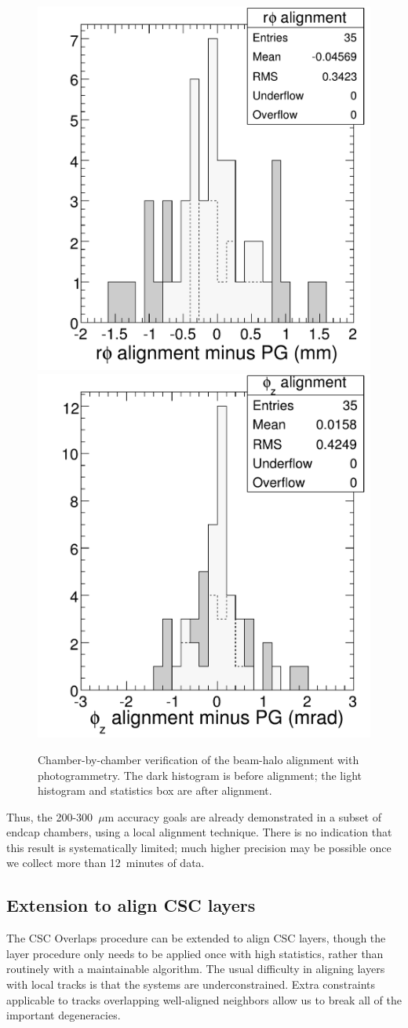 \documentclass[12pt]{article}
\begin{document}
\begin{figure}
\begin{center}
\includegraphics[width=0.45\linewidth]{delta_translations_goodcolors.pdf} \includegraphics[width=0.45\linewidth]{delta_rotations_goodcolors.pdf}
\end{center}
\caption{Chamber-by-chamber verification of the beam-halo alignment with photogrammetry.  The dark histogram is before alignment; the light histogram and statistics box are after alignment. \label{fig:overlaps_data2}}
\end{figure}

Thus, the 200-300~$\mu$m accuracy goals are already demonstrated in a
subset of endcap chambers, using a local alignment technique.  There
is no indication that this result is systematically limited; much
higher precision may be possible once we collect more than 12~minutes
of data.

\subsection{Extension to align CSC layers}
\label{sec:CSC_layer_alignment}

The CSC Overlaps procedure can be extended to align CSC layers, though
the layer procedure only needs to be applied once with high
statistics, rather than routinely with a maintainable algorithm.  The
usual difficulty in aligning layers with local tracks is that the
systems are underconstrained.  Extra constraints applicable to tracks
overlapping well-aligned neighbors allow us to break all of the
important degeneracies.
\end{document}
